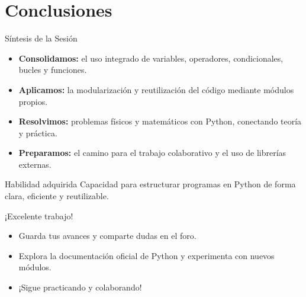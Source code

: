 \documentclass[10pt]{beamer}
\begin{document}
\section{Conclusiones}


\begin{frame}{Síntesis de la Sesión}
  \begin{itemize}
    \item \textbf{Consolidamos:} el uso integrado de variables, operadores, condicionales, bucles y funciones.
    \item \textbf{Aplicamos:} la modularización y reutilización del código mediante módulos propios.
    \item \textbf{Resolvimos:} problemas físicos y matemáticos con Python, conectando teoría y práctica.
    \item \textbf{Preparamos:} el camino para el trabajo colaborativo y el uso de librerías externas.
  \end{itemize}
  \begin{block}{Habilidad adquirida}
    Capacidad para estructurar programas en Python de forma clara, eficiente y reutilizable.
  \end{block}
\end{frame}


\begin{frame}
  \huge{\centerline{¡Excelente trabajo!}}
  \vspace{0.5cm}
  \normalsize
  \begin{itemize}
    \item Guarda tus avances y comparte dudas en el foro.
    \item Explora la documentación oficial de Python y experimenta con nuevos módulos.
    \item ¡Sigue practicando y colaborando!
  \end{itemize}
\end{frame}
\end{document}
